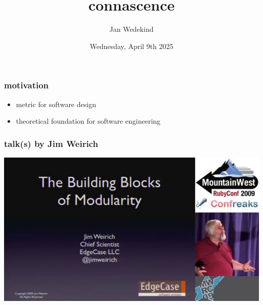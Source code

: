 \documentclass[aspectratio=169,12pt,xcolor=dvipsnames]{beamer}
\title{\Huge connascence}
\author{Jan Wedekind}
\date{Wednesday, April 9th 2025}
\begin{document}
\begin{frame}
  \titlepage
\end{frame}

\begin{frame}
  \frametitle{motivation}
  \begin{itemize}
    \item metric for software design
    \item theoretical foundation for software engineering
  \end{itemize}
\end{frame}

\begin{frame}
  \frametitle{talk(s) by Jim Weirich}
  \begin{center}
    \href{https://www.youtube.com/watch?v=q85rdBMe9GY}{\includegraphics[height=.8\textheight]{weirich}}
  \end{center}
\end{frame}
\end{document}
